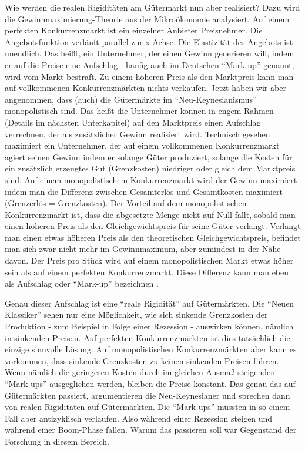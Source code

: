 Wie werden die realen Rigiditäten am Gütermarkt nun aber realisiert? Dazu wird die Gewinnmaximierung-Theorie aus der Mikroökonomie analysiert. Auf einem perfekten Konkurrenzmarkt ist ein einzelner Anbieter Preisnehmer. Die Angebotsfunktion verläuft parallel zur x-Achse. Die Elastizität des Angebots ist unendlich. Das heißt, ein Unternehmer, der einen Gewinn generieren will, indem er auf die Preise eine Aufschlag - häufig auch im Deutschen "`Mark-up"' genannt, wird vom Markt bestraft. Zu einem höheren Preis als den Marktpreis kann man auf vollkommenen Konkurrenzmärkten nichts verkaufen. Jetzt haben wir aber angenommen, dass (auch) die Gütermärkte im "`Neu-Keynesianismus"' monopolistisch sind. Das heißt die Unternehmer können in engem Rahmen (Details im nächsten Unterkapitel) auf den Marktpreis einen Aufschlag verrechnen, der als zusätzlicher Gewinn realisiert wird. Technisch gesehen maximiert ein Unternehmer, der auf einem vollkommenen Konkurrenzmarkt agiert seinen Gewinn indem er solange Güter produziert, solange die Kosten für ein zusätzlich erzeugtes Gut (Grenzkosten) niedriger oder gleich dem Marktpreis sind. Auf einem monopolistischem Konkurrenzmarkt wird der Gewinn maximiert indem man die Differenz zwischen Gesamterlös und Gesamtkosten maximiert (Grenzerlös = Grenzkosten).  Der Vorteil auf dem monopolistischen Konkurrenzmarkt ist, dass die abgesetzte Menge nicht auf Null fällt, sobald man einen höheren Preis als den Gleichgewichtspreis für seine Güter verlangt. Verlangt man einen etwas höheren Preis als den theoretischen Gleichgewichtspreis, befindet man sich zwar nicht mehr im Gewinnmaximum, aber zumindest in der Nähe davon. Der Preis pro Stück wird auf einem monopolistischen Markt etwas höher sein als auf einem perfekten Konkurrenzmarkt. Diese Differenz kann man eben als Aufschlag oder "`Mark-up"' bezeichnen \parencite[S. 379f]{Snowdon2005} \parencite[S. 14]{Mankiw1991}. 

Genau dieser Aufschlag ist eine "`reale Rigidität"' auf Gütermärkten. Die "`Neuen Klassiker"' sehen nur eine Möglichkeit, wie sich sinkende Grenzkosten der Produktion - zum Beispiel in Folge einer Rezession - auswirken können, nämlich in sinkenden Preisen. Auf perfekten Konkurrenzmärkten ist dies tatsächlich die einzige sinnvolle Lösung. Auf monopolistischen Konkurrenzmärkten aber kann es vorkommen, dass sinkende Grenzkosten zu keinen sinkenden Preisen führen. Wenn nämlich die geringeren Kosten durch im gleichen Ausmaß steigenden "`Mark-ups"' ausgeglichen werden, bleiben die Preise konstant. Das genau das auf Gütermärkten passiert, argumentieren die Neu-Keynesianer und sprechen dann von realen Rigiditäten auf Gütermärkten. Die "`Mark-ups"' müssten in so einem Fall aber antizyklisch verlaufen. Also während einer Rezession steigen und während einer Boom-Phase fallen. Warum das passieren soll war Gegenstand der Forschung in diesem Bereich.

